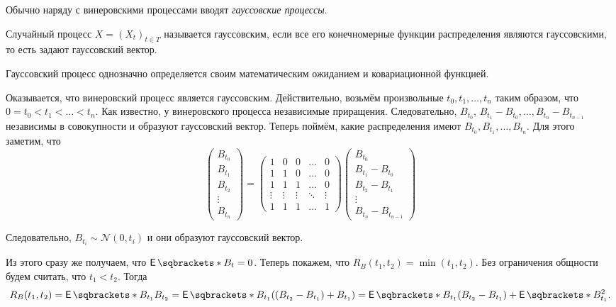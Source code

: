 Обычно наряду с винеровскими процессами вводят \emph{гауссовские процессы}.
\begin{definition}
	Случайный процесс \(X = (X_{t})_{t \in T}\) называется гауссовским, если 
	все его конечномерные функции распределения являются гауссовскими, то есть 
	задают гауссовский вектор.
\end{definition}
\begin{property}
	Гауссовский процесс однозначно определяется своим математическим ожиданием 
	и ковариационной функцией.
\end{property}
\begin{example}
	Оказывается, что винеровский процесс является гауссовским. Действительно, 
	возьмём произвольные \(t_{0}, t_{1}, \dots, t_{n}\) таким образом, что \(0 
	= t_{0} < t_{1} < \dots < t_{n}\). Как известно, у винеровского процесса 
	независимые приращения. Следовательно, \(B_{t_{0}}\), \(B_{t_{1}} - 
	B_{t_{0}}, \dots, B_{t_{n}} - B_{t_{n - 1}}\) независимы в 
	совокупности и образуют гауссовский вектор. Теперь поймём, какие 
	распределения имеют \(B_{t_{0}}, B_{t_{1}}, \dots, B_{t_{n}}\). Для этого 
	заметим, что
	\[
	\begin{pmatrix}
	B_{t_{0}} \\ B_{t_{1}} \\ B_{t_{2}} \\ \vdots \\ B_{t_{n}}
	\end{pmatrix}
	=
	\begin{pmatrix}
	1 & 0 & 0 & \ldots & 0 \\
	1 & 1 & 0 & \ldots & 0 \\
	1 & 1 & 1 & \ldots & 0 \\
	\vdots & \vdots & \vdots & \ddots & \vdots \\
	1 & 1 & 1 & \ldots & 1
	\end{pmatrix}
	\begin{pmatrix}
	B_{t_{0}} \\ B_{t_{1}} - B_{t_{0}} \\ B_{t_{2}} - B_{t_{1}} \\ \vdots \\ 
	B_{t_{n}} - B_{t_{n - 1}}
	\end{pmatrix}
	\]

	Следовательно, \(B_{t_{i}} \sim \mathcal{N}(0, t_{i})\) и они образуют 
	гауссовский вектор.
\end{example}
Из этого сразу же получаем, что \(\E{B_{t}} = 0\). Теперь покажем, что 
\(R_{B}(t_{1}, t_{2}) = \min(t_{1}, t_{2})\). Без ограничения общности будем 
считать, что \(t_{1} < t_{2}\). Тогда
\[
	R_{B}(t_{1}, t_{2}) = \E{B_{t_{1}}B_{t_{2}}} = \E{B_{t_{1}}((B_{t_{2}} - 
	B_{t_{1}}) + B_{t_{1}})} = \E{B_{t_{1}}(B_{t_{2}} - 
	B_{t_{1}})} + \E{B_{t_{1}}^{2}}.
\]


